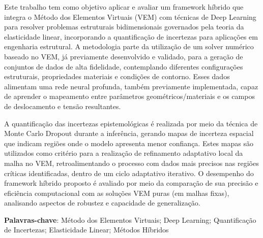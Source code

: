 \documentclass[12pt,openright,oneside,a4paper,english,brazil]{abntex2}
\begin{document}


\imprimircapa

\imprimirfolhaderosto

\setlength{\absparsep}{18pt}
\begin{resumo}
Este trabalho tem como objetivo aplicar e avaliar um framework híbrido que integra o Método dos Elementos Virtuais (VEM) com técnicas de Deep Learning para resolver problemas estruturais bidimensionais governados pela teoria da elasticidade linear, incorporando a quantificação de incertezas para aplicações em engenharia estrutural. A metodologia parte da utilização de um solver numérico baseado no VEM, já previamente desenvolvido e validado, para a geração de conjuntos de dados de alta fidelidade, contemplando diferentes configurações estruturais, propriedades materiais e condições de contorno. Esses dados alimentam uma rede neural profunda, também previamente implementada, capaz de aprender o mapeamento entre parâmetros geométricos/materiais e os campos de deslocamento e tensão resultantes.

A quantificação das incertezas epistemológicas é realizada por meio da técnica de Monte Carlo Dropout durante a inferência, gerando mapas de incerteza espacial que indicam regiões onde o modelo apresenta menor confiança. Estes mapas são utilizados como critério para a realização de refinamento adaptativo local da malha no VEM, retroalimentando o processo com dados mais precisos nas regiões críticas identificadas, dentro de um ciclo adaptativo iterativo. O desempenho do framework híbrido proposto é avaliado por meio da comparação de sua precisão e eficiência computacional com as soluções VEM puras (em malhas fixas), analisando aspectos de robustez e capacidade de generalização.
\vspace{1em}
\begin{center}
\textbf{Palavras-chave}: Método dos Elementos Virtuais; Deep Learning; Quantificação de Incertezas; Elasticidade Linear; Métodos Híbridos
\end{center}
\end{resumo}
\end{document}

